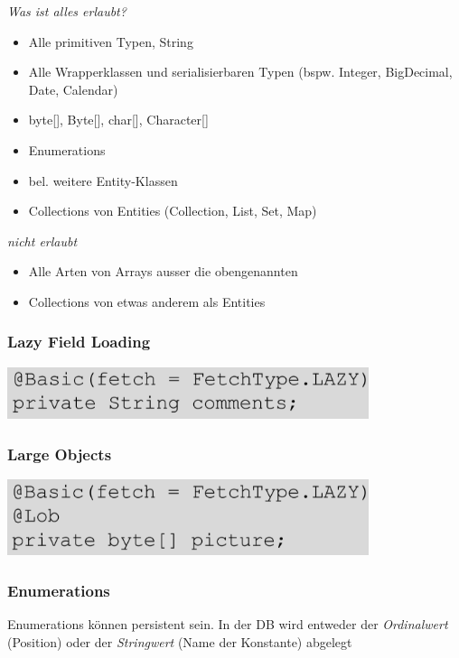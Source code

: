 \documentclass{report}
\newenvironment{Figure}
	{\par\medskip\noindent\minipage{\linewidth}}
	{\endminipage\par\medskip}
\theoremstyle{definition}
\theoremstyle{example}
\begin{document}
\textit{Was ist alles erlaubt?}
\begin{itemize}
	\item Alle primitiven Typen, String
	\item Alle Wrapperklassen und serialisierbaren Typen (bspw. Integer, BigDecimal, Date, Calendar)
	\item byte[], Byte[], char[], Character[]
	\item Enumerations
	\item bel. weitere Entity-Klassen
	\item Collections von Entities (Collection, List, Set, Map)
\end{itemize}

\textit{nicht erlaubt}
\begin{itemize}
	\item Alle Arten von Arrays ausser die obengenannten
	\item Collections von etwas anderem als Entities
\end{itemize}

\subsubsection{Lazy Field Loading}

\begin{Figure}
\centering
\includegraphics[width=400px]{img/LazyFieldLoading.png}
	\label{fig:Lazy Field Loading}
\end{Figure}

\subsubsection{Large Objects}

\begin{Figure}
\centering
\includegraphics[width=400px]{img/LargeObjects.png}
	\label{fig:Large Objects}
\end{Figure}

\subsubsection{Enumerations}
Enumerations können persistent sein. In der DB wird entweder der \textit{Ordinalwert} (Position) oder der \textit{Stringwert} (Name der Konstante) abgelegt
\end{document}
